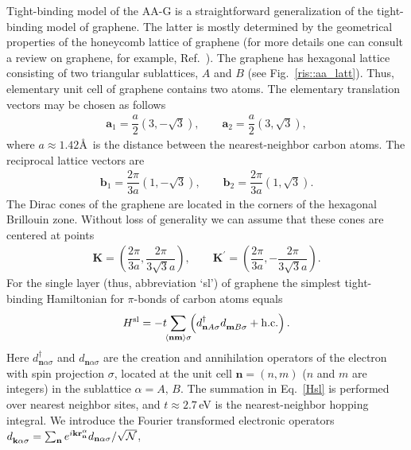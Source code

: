 \documentclass[prb,twocolumn,showpacs,aps,superscriptaddress,floatfix]{revtex4}
\begin{document}
Tight-binding model of the AA-G is a straightforward generalization of the
tight-binding model of graphene. The latter is mostly determined by the
geometrical properties of the honeycomb lattice of graphene (for more
details one can consult a review on graphene, for example,
Ref.~). 
The graphene has hexagonal lattice consisting of two triangular
sublattices, $A$ and $B$
(see
Fig.~\ref{ris::aa_latt}).
Thus, elementary unit cell of graphene contains two atoms. The elementary
translation vectors may be chosen as follows
\begin{eqnarray}\mathbf{a}_1 = \dfrac{a}{2} \left( 3,-\sqrt3\right),\qquad\mathbf{a}_2 = \dfrac{a}{2} \left( 3,\sqrt3 \right),
\end{eqnarray}
where
$a\approx1.42$\AA\
is the distance between the nearest-neighbor carbon atoms. The reciprocal
lattice vectors are
\begin{eqnarray}\mathbf{b}_1 = \dfrac{2\pi}{3a}\left( 1,-\sqrt3\right),\qquad\mathbf{b}_2 = \dfrac{2\pi}{3a}\left(1,\sqrt3 \right).
\end{eqnarray}
The Dirac cones of the graphene are located in the corners of the hexagonal
Brillouin zone. Without loss of generality we can assume that these cones
are centered at points
\begin{eqnarray}\label{eq::K}
\mathbf{K}= \left(\dfrac{2\pi}{3a},\dfrac{2\pi}{3\sqrt{3}a} \right),\qquad\mathbf{K^\prime} = \left(\dfrac{2\pi}{3a},-\dfrac{2\pi}{3\sqrt{3}a} \right).
\end{eqnarray}
For the single layer (thus, abbreviation `sl') of graphene the simplest
tight-binding Hamiltonian for
$\pi$-bonds 
of carbon atoms equals
\begin{equation}\label{Hsl}
H^{\rm sl}
=
-t\!\!
\sum_{\langle\mathbf{nm}\rangle\sigma }\!\!\left(d_{\mathbf{n}A\sigma }^{\dag}d_{\mathbf{m}B \sigma }^{\phantom{\dag}}+\text{h.c.}\right).
\end{equation}
Here
$d_{\mathbf{n}\alpha\sigma}^{\dag}$
and
$d_{\mathbf{n}\alpha\sigma}^{\phantom{\dag}}$
are the creation and annihilation operators of the electron with spin
projection $\sigma$, located at the unit cell
$\mathbf{n}=(n,m)$
($n$ and $m$ are integers) in the sublattice
$\alpha=A,\,B$.
The summation in
Eq.~\eqref{Hsl}
is performed over nearest neighbor sites, and
$t\approx2.7$\,eV
is the nearest-neighbor hopping integral. We introduce the Fourier
transformed electronic operators
$d_{\mathbf{k}\alpha\sigma}^{\phantom{\dag}}
=
\sum_{\mathbf{n}}
	e^{i\mathbf{kr}_{\mathbf{n}}^{\alpha}}
	d_{\mathbf{n}\alpha\sigma}^{\phantom{\dag}}/\sqrt{\cal N}$,
\end{document}
